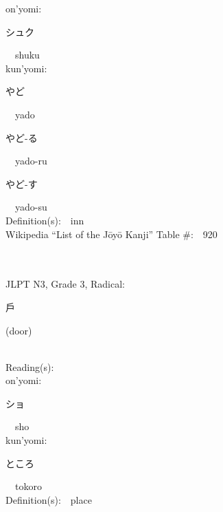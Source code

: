 \begin{multicols}{2}
{\hspace*{1em}}on'yomi:\ \ \\
{\hspace*{2em}}{\begin{CJK}{UTF8}{min} シュク \end{CJK}}\ \ shuku\ \ \\
{\hspace*{1em}}kun'yomi:\ \ \\
{\hspace*{2em}}{\begin{CJK}{UTF8}{min} やど \end{CJK}}\ \ yado\ \ \\
{\hspace*{2em}}{\begin{CJK}{UTF8}{min} やど-る \end{CJK}}\ \ yado-ru\ \ \\
{\hspace*{2em}}{\begin{CJK}{UTF8}{min} やど-す \end{CJK}}\ \ yado-su\ \ \\
Definition(s):\ \ inn \\
Wikipedia ``List of the J\=oy\=o Kanji'' Table \#:\ \ 920 \\
\ \ \\
{\fontsize{34pt}{40pt}  }\ \ \\  %
{JLPT N3, Grade 3, Radical:\ \ {\begin{CJK}{UTF8}{min} 戶 \end{CJK}} (door) } \\
Reading(s):\ \ \\
{\hspace*{1em}}on'yomi:\ \ \\
{\hspace*{2em}}{\begin{CJK}{UTF8}{min} ショ \end{CJK}}\ \ sho\ \ \\
{\hspace*{1em}}kun'yomi:\ \ \\
{\hspace*{2em}}{\begin{CJK}{UTF8}{min} ところ \end{CJK}}\ \ tokoro\ \ \\
Definition(s):\ \ place \\

\end{multicols}
